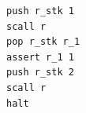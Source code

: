 \documentclass{beamer}
\begin{document}
\begin{frame}[fragile]
\begin{columns}[c]

\begin{center}
\begin{lstlisting}
push r_stk 1
scall r
pop r_stk r_1
assert r_1 1
push r_stk 2
scall r 
halt
\end{lstlisting}
\end{center}

\end{columns}
\end{frame}

\end{document}
